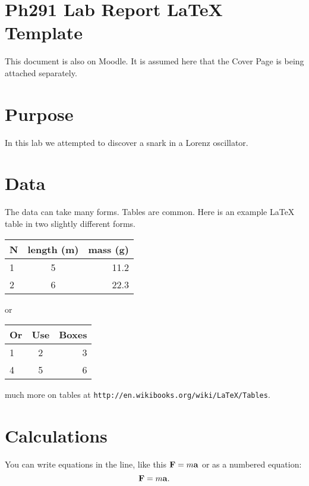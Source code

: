 \documentclass[12pt]{article}
\newcommand{\pdfgraphics}{\ifpdf\DeclareGraphicsExtensions{.pdf,.jpg}\else\fi}
\begin{document}
\pdfgraphics

\section*{Ph291 Lab Report LaTeX Template}  %

\medskip
\noindent %
This document is also on Moodle.  It is assumed here that the Cover Page is being attached
separately.

\section{Purpose}  
In this lab we attempted to discover a snark in a Lorenz oscillator.

\section{Data}
The data can take many forms.  Tables are common.  Here is an example LaTeX table in two slightly different forms.

\bigskip
\begin{tabular}{ l c r }
  \hline
  N & length (m) & mass (g) \\ \hline
  1 & 5 & 11.2  \\ \hline
  2 & 6 & 22.3 \\ \hline
\end{tabular}
\medskip
or
\medskip
\begin{tabular}{ | l | c | r | }
  \hline
  Or & Use & Boxes \\ \hline
  1 & 2 & 3   \\ \hline
  4 & 5 & 6 \\ \hline
\end{tabular}
\medskip
much more on tables at \verb=http://en.wikibooks.org/wiki/LaTeX/Tables=.

\section{Calculations}
You can write equations in the line, like this ${\bf F}=m{\bf a}$ or as a numbered equation:
\begin{equation}
{\bf F} = m{\bf a} .
\end{equation}
 
\end{document}
